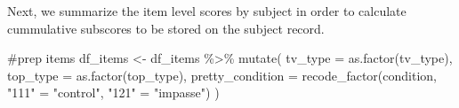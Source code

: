 \documentclass[
  letterpaper,
  DIV=11,
  numbers=noendperiod]{scrreprt}
\newenvironment{Shaded}{\begin{snugshade}}{\end{snugshade}}
\newcommand{\AttributeTok}[1]{\textcolor[rgb]{0.40,0.45,0.13}{#1}}
\newcommand{\CommentTok}[1]{\textcolor[rgb]{0.37,0.37,0.37}{#1}}
\newcommand{\FunctionTok}[1]{\textcolor[rgb]{0.28,0.35,0.67}{#1}}
\newcommand{\NormalTok}[1]{\textcolor[rgb]{0.00,0.23,0.31}{#1}}
\newcommand{\OtherTok}[1]{\textcolor[rgb]{0.00,0.23,0.31}{#1}}
\newcommand{\SpecialCharTok}[1]{\textcolor[rgb]{0.37,0.37,0.37}{#1}}
\newcommand{\StringTok}[1]{\textcolor[rgb]{0.13,0.47,0.30}{#1}}
\begin{document}
Next, we summarize the item level scores by subject in order to
calculate cummulative subscores to be stored on the subject record.

\begin{Shaded}
\begin{Highlighting}[]
\CommentTok{\#prep items}
\NormalTok{df\_items }\OtherTok{\textless{}{-}}\NormalTok{ df\_items }\SpecialCharTok{\%\textgreater{}\%} \FunctionTok{mutate}\NormalTok{(}
  \AttributeTok{tv\_type =} \FunctionTok{as.factor}\NormalTok{(tv\_type),}
  \AttributeTok{top\_type =} \FunctionTok{as.factor}\NormalTok{(top\_type),}
  \AttributeTok{pretty\_condition =} \FunctionTok{recode\_factor}\NormalTok{(condition, }\StringTok{"111"} \OtherTok{=} \StringTok{"control"}\NormalTok{, }\StringTok{"121"} \OtherTok{=}  \StringTok{"impasse"}\NormalTok{)}
\NormalTok{)}


\end{Highlighting}
\end{Shaded}
\end{document}
